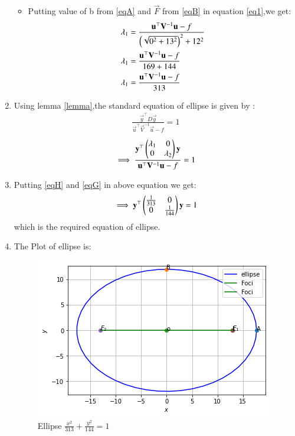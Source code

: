 \documentclass[journal,12pt,twocolumn]{IEEEtran}
\begin{document}
\begin{enumerate}
\begin{itemize}
\item Putting value of b from \eqref{eqA} and $\vec{F}$ from \eqref{eqB} in equation \eqref{eq1},we get:
\begin{align}
   \lambda_1&= \frac{\mathbf{u}^{\top}\mathbf{V}^{-1}\mathbf{u}-f}{\left(\sqrt{0^2+13^2}\right)^2+12^2}\\
     \lambda_1&= \frac{\mathbf{u}^{\top}\mathbf{V}^{-1}\mathbf{u}-f}{169+144}\\
      \lambda_1&= \frac{\mathbf{u}^{\top}\mathbf{V}^{-1}\mathbf{u}-f}{313}\label{eqG}
\end{align}
\end{itemize}
\item Using lemma \eqref{lemma},the standard equation of ellipse is given by :
\begin{align}
\frac{\vec{y}^{\top}D\vec{y}}{\vec{u}^{\top}\vec{V}^{-1}\vec{u}-f}=1
\end{align}
\begin{align}
\implies \frac{\mathbf{y}^{\top}\begin{pmatrix}\lambda_1& 0 \\ 0 & \lambda_2\end{pmatrix}\mathbf{y} }{\mathbf{u}^{\top}\mathbf{V}^{-1}\mathbf{u}-f}=1
\end{align}
\item Putting \eqref{eqH} and \eqref{eqG} in above equation we get:
\begin{align}
\implies \mathbf{y}^{\top}\begin{pmatrix}\frac{1}{313}& 0 \\ 0 & \frac{1}{144}\end{pmatrix}\mathbf{y}=1
\end{align}
which is the required equation of ellipse.
\item The Plot of ellipse is:
\begin{figure}[!ht]
    \centering
    \includegraphics[width=\columnwidth]{figure6.png}
    \caption{Ellipse $\frac{x^2}{313} + \frac{y^2}{144} = 1$}
    \label{fig:ellipse}
\end{figure} 
\end{enumerate}
\end{document}
